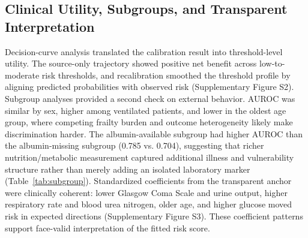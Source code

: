 \documentclass[utf8]{FrontiersinVancouver}
\begin{document}
\subsection{Clinical Utility, Subgroups, and Transparent Interpretation}
Decision-curve analysis translated the calibration result into threshold-level utility. The source-only trajectory showed positive net benefit across low-to-moderate risk thresholds, and recalibration smoothed the threshold profile by aligning predicted probabilities with observed risk (Supplementary Figure S2). Subgroup analyses provided a second check on external behavior. AUROC was similar by sex, higher among ventilated patients, and lower in the oldest age group, where competing frailty burden and outcome heterogeneity likely make discrimination harder. The albumin-available subgroup had higher AUROC than the albumin-missing subgroup (0.785 vs. 0.704), suggesting that richer nutrition/metabolic measurement captured additional illness and vulnerability structure rather than merely adding an isolated laboratory marker (Table~\ref{tab:subgroup}). Standardized coefficients from the transparent anchor were clinically coherent: lower Glasgow Coma Scale and urine output, higher respiratory rate and blood urea nitrogen, older age, and higher glucose moved risk in expected directions (Supplementary Figure S3). These coefficient patterns support face-valid interpretation of the fitted risk score.

\begin{table}[htbp]
\centering
\caption{Selected eICU subgroup performance for the source-only transparent logistic anchor.}
\label{tab:subgroup}
\end{table}
\end{document}
